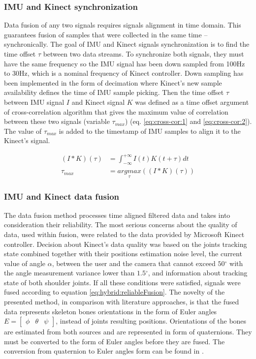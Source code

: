 \documentclass[sensors,article,submit,moreauthors,pdftex,10pt,a4paper]{mdpi}
\newcommand{\degree}{\ensuremath{{}^{\circ}}\xspace}
\begin{document}
\subsubsection{IMU and Kinect synchronization}
Data fusion of any two signals requires signals alignment in time domain. This guarantees fusion of samples that were collected in the same time -- synchronically. The goal of IMU and Kinect signals synchronization is to find the time offset $\tau$ between two data streams. To synchronize both signals, they must have the same frequency so the IMU signal has been down sampled from 100Hz to 30Hz, which is a nominal frequency of Kinect controller. Down sampling has been implemented in the form of decimation where Kinect’s new sample availability defines the time of IMU sample picking. Then the time offset $\tau$ between IMU signal $I$ and Kinect signal $K$ was defined as a time offset argument of cross-correlation algorithm that gives the maximum value of correlation between these two signals (variable $\tau_{max}$) (eq. \ref{eq:cross-cor:1} and \ref{eq:cross-cor:2}). The value of $\tau_{max}$ is added to the timestamp of IMU samples to align it to the Kinect’s signal.

\begin{subequations}
	\begin{align}
		(I \ast K)(\tau) & = \int_{-\infty}^{+\infty}I(t)K(t+\tau)dt\label{eq:cross-cor:1}   \\
		\tau_{max}       & = \underset{\tau}{argmax}((I \ast K)(\tau))\label{eq:cross-cor:2} 
	\end{align}
	\label{eq:cross-cor}
\end{subequations}



\subsubsection{IMU and Kinect data fusion}
The data fusion method processes time aligned filtered data and takes into consideration their reliability. The most serious concerns about the quality of data, used within fusion, were related to the data provided by Microsoft Kinect controller. Decision about Kinect’s data quality was based on the joints tracking state combined together with their positions estimation noise level, the current value of angle $\alpha$, between the user and the camera that cannot exceed $50\degree$ with the angle measurement variance lower than $1.5\degree$, and information about tracking state of both shoulder joints. If all these conditions were satisfied, signals were fused according to equation \ref{eq:hybrid:reliableFusion}. The novelty of the presented method, in comparison with literature approaches, is that the fused data represents skeleton bones orientations in the form of Euler angles $E = \begin{bmatrix} \phi &  \theta & \psi \end{bmatrix}$, instead of joints resulting positions. Orientations of the bones are estimated from both sources and are represented in form of quaternions. They must be converted to the form of Euler angles before they are fused. The conversion from quaternion to Euler angles form can be found in \cite{Dunn2011}.
\end{document}
